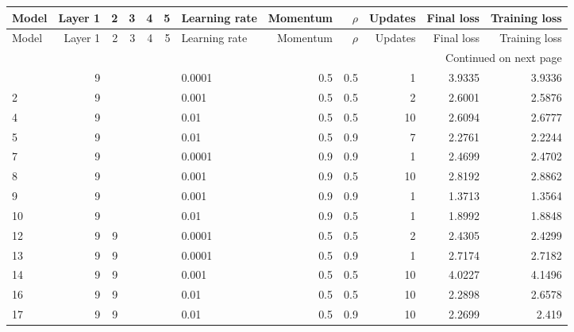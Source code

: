 \begin{longtable}{lrrrrrlrrrrr}
\label{tab:Results_t}\\
\toprule
Model & Layer 1 & 2 & 3 & 4 & 5 & Learning rate & Momentum & $\rho$ & Updates & Final loss & Training loss \\
\midrule
\endfirsthead

\toprule
Model & Layer 1 & 2 & 3 & 4 & 5 & Learning rate & Momentum & $\rho$ & Updates & Final loss & Training loss \\
\midrule
\endhead
\midrule
\multicolumn{12}{r}{{Continued on next page}} \\
\midrule
\endfoot

\bottomrule
\endlastfoot
    0 &       9 &   &   &   &   &        0.0001 &      0.5 &    0.5 &       1 &     3.9335 &        3.9336 \\
    2 &       9 &   &   &   &   &         0.001 &      0.5 &    0.5 &       2 &     2.6001 &        2.5876 \\
    4 &       9 &   &   &   &   &          0.01 &      0.5 &    0.5 &      10 &     2.6094 &        2.6777 \\
    5 &       9 &   &   &   &   &          0.01 &      0.5 &    0.9 &       7 &     2.2761 &        2.2244 \\
    7 &       9 &   &   &   &   &        0.0001 &      0.9 &    0.9 &       1 &     2.4699 &        2.4702 \\
    8 &       9 &   &   &   &   &         0.001 &      0.9 &    0.5 &      10 &     2.8192 &        2.8862 \\
    9 &       9 &   &   &   &   &         0.001 &      0.9 &    0.9 &       1 &     1.3713 &        1.3564 \\
   10 &       9 &   &   &   &   &          0.01 &      0.9 &    0.5 &       1 &     1.8992 &        1.8848 \\
   12 &       9 & 9 &   &   &   &        0.0001 &      0.5 &    0.5 &       2 &     2.4305 &        2.4299 \\
   13 &       9 & 9 &   &   &   &        0.0001 &      0.5 &    0.9 &       1 &     2.7174 &        2.7182 \\
   14 &       9 & 9 &   &   &   &         0.001 &      0.5 &    0.5 &      10 &     4.0227 &        4.1496 \\
   16 &       9 & 9 &   &   &   &          0.01 &      0.5 &    0.5 &      10 &     2.2898 &        2.6578 \\
   17 &       9 & 9 &   &   &   &          0.01 &      0.5 &    0.9 &      10 &     2.2699 &         2.419 \\

\end{longtable}
